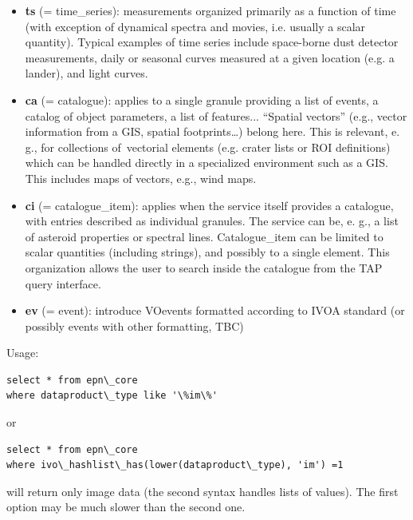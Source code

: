 \documentclass[11pt,a4paper]{ivoa}
\begin{document}
\begin{itemize}
\item \textbf{ts }(= time\_series): measurements organized primarily as a function of time (with exception of dynamical spectra and movies, i.e. usually a scalar quantity). Typical examples of time series include space-borne dust detector measurements, daily or seasonal curves measured at a given location (e.g. a lander), and light curves.
\item \textbf{ca }(= catalogue): applies to a single granule providing a list of events, a catalog of object parameters, a list of features... ``Spatial vectors'' (e.g., vector information from a GIS, spatial footprints…) belong here. This is relevant, e. g., for collections of vectorial elements (e.g. crater lists or ROI definitions) which can be handled directly in a specialized environment such as a GIS. This includes maps of vectors, e.g., wind maps.\\
\item \textbf{ci }(= catalogue\_item): applies when the service itself provides a catalogue, with entries described as individual granules. The service can be, e. g., a list of asteroid properties or spectral lines. Catalogue\_item can be limited to scalar quantities (including strings), and possibly to a single element. This organization allows the user to search inside the catalogue from the TAP query interface.
\item \textbf{ev} (= event): introduce VOevents formatted according to IVOA standard (or possibly events with other formatting, TBC)
\end{itemize}

Usage:






\begin{verbatim}select * from epn\_core 
where dataproduct\_type like '\%im\%'\end{verbatim}




or 






\begin{verbatim}select * from epn\_core 
where ivo\_hashlist\_has(lower(dataproduct\_type), 'im') =1\end{verbatim}




will return only image data (the second syntax handles lists of values). The first option may be much slower than the second one.
\end{document}

